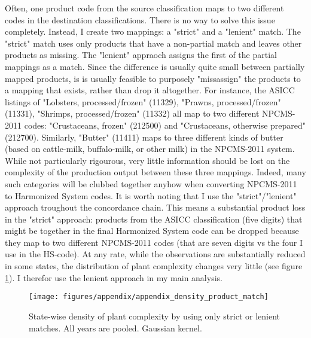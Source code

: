 \documentclass[11pt]{article}
\begin{document}
\begin{appendices}
Often, one product code from the source classification maps to two different codes in the destination classifications. There is no way to solve this issue completely. Instead, I create two mappings: a "strict" and a "lenient" match. The "strict" match uses only products that have a non-partial match and leaves other products as missing. The "lenient" appraoch assigns the first of the partial mappings as a match. Since the difference is usually quite small between partially mapped products, is is usually feasible to purposely "missassign" the products to a mapping that exists, rather than drop it altogether. For instance, the ASICC listings of "Lobsters, processed/frozen" (11329), "Prawns, processed/frozen" (11331), "Shrimps, processed/frozen" (11332) all map to two different NPCMS-2011 codes: "Crustaceans, frozen" (212500) and "Crustaceans, otherwise prepared" (212700). Similarly, "Butter" (11411) maps to three different kinds of butter (based on cattle-milk, buffalo-milk, or other milk) in the NPCMS-2011 system. While not particularly rigourous, very little information should be lost on the complexity of the production output between these three mappings. Indeed, many such categories will be clubbed together anyhow when converting NPCMS-2011 to Harmonized System codes. It is worth noting that I use the "strict"/"lenient" approach troughout the concordance chain. This means a substantial product loss in the "strict" approach: products from the ASICC classification (five digits) that might be together in the final Harmonized System code can be dropped because they map to two different NPCMS-2011 codes (that are seven digits vs the four I use in the HS-code). At any rate, while the observations are substantially reduced in some states, the distribution of plant complexity changes very little (see figure \ref{fig:density_product_match}). I therefor use the lenient approach in my main analysis.

\begin{figure}[htpb]
	\centering
	\texttt{[image: figures/appendix/appendix\_density\_product\_match]}
	\caption{State-wise density of plant complexity by using only strict or lenient matches. All years are pooled. Gaussian kernel.}%
	\label{fig:density_product_match}
\end{figure}








\end{appendices}
\end{document}
